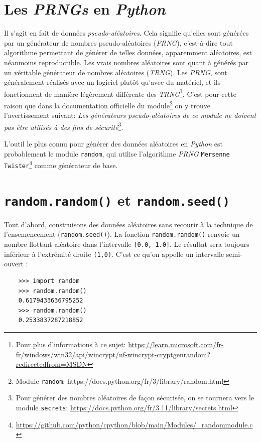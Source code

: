\documentclass[a4paper,11pt]{book}
\begin{document}
\section{Les \textit{PRNGs} en \textit{Python}}
Il s'agit en fait de données \textit{pseudo-aléatoires}. Cela signifie qu'elles sont générées par un générateur de nombres pseudo-aléatoires (\textit{PRNG}), c'est-à-dire tout algorithme permettant de générer de telles données, apparemment aléatoires, est néanmoins reproductible. Les \og vrais\fg{} nombres aléatoires sont quant à générés par un véritable générateur de nombres aléatoires (\textit{TRNG}). Les \textit{PRNG}, sont généralement réalisés avec un logiciel plutôt qu'avec du matériel, et ils fonctionnent de manière légèrement différente des \textit{TRNG}\footnote{Pour plus d'informations à ce sujet: \url{https://learn.microsoft.com/fr-fr/windows/win32/api/wincrypt/nf-wincrypt-cryptgenrandom?redirectedfrom=MSDN}}. C'est pour cette raison que dans la documentation officielle du module\footnote{Module \texttt{random}: https://docs.python.org/fr/3/library/random.html} on y trouve l'avertissement suivant: \og \textit{Les générateurs pseudo-aléatoires de ce module ne doivent pas être utilisés à des fins de sécurité}\fg{}\footnote{Pour générer des nombres aléatoires de façon sécurisée, on se tournera vers le module \texttt{secrets}: \url{https://docs.python.org/fr/3.11/library/secrets.html}}.  
\medskip

L'outil le plus connu pour générer des données aléatoires en \textit{Python} est probablement le module \texttt{random}, qui utilise l'algorithme \textit{PRNG} \texttt{Mersenne Twister}\footnote{\url{https://github.com/python/cpython/blob/main/Modules/_randommodule.c}} comme générateur de base.

\section{\texttt{random.random()} et \texttt{random.seed()}}
Tout d'abord, construisons des données aléatoires sans recourir à la technique de l'ensemencement (\texttt{random.seed()}). La fonction \texttt{random.random()} renvoie un nombre flottant aléatoire dans l'intervalle \texttt{[0.0, 1.0]}. Le résultat sera toujours inférieur à l'extrémité droite \texttt{(1,0)}. C'est ce qu'on appelle un intervalle semi-ouvert : 
\begin{verbatim}
    >>> import random
    >>> random.random()
    0.6179433636795252
    >>> random.random()
    0.2533837287218852
\end{verbatim}
\medskip
\end{document}
